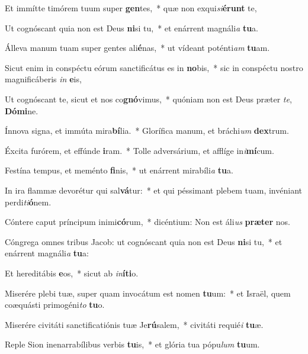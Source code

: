 \item Et immítte timórem tuum super \textbf{gen}tes,~* quæ non exqui\textit{si}\textbf{é}\textbf{runt} te,
\item Ut cognóscant quia non est Deus \textbf{ni}si tu,~* et enárrent magnáli\textit{a} \textbf{tu}a.
\item Álleva manum tuam super gentes ali\textbf{é}nas,~* ut vídeant poténti\textit{am} \textbf{tu}am.
\item Sicut enim in conspéctu eórum sanctificátus es in \textbf{no}bis,~* sic in conspéctu nostro magnificáberis \textit{in} \textbf{e}is,
\item Ut cognóscant te, sicut et nos co\textbf{gnó}vimus,~* quóniam non est Deus præter \textit{te}, \textbf{Dó}\textbf{mi}ne.
\item Ínnova signa, et immúta mira\textbf{bí}lia.~* Glorífica manum, et bráchi\textit{um} \textbf{dex}trum.
\item Éxcita furórem, et effúnde \textbf{i}ram.~* Tolle adversárium, et afflíge in\textit{i}\textbf{mí}cum.
\item Festína tempus, et meménto \textbf{fi}nis,~* ut enárrent mirabíli\textit{a} \textbf{tu}a.
\item In ira flammæ devorétur qui sal\textbf{vá}tur:~* et qui péssimant plebem tuam, invéniant perdi\textit{ti}\textbf{ó}nem.
\item Cóntere caput príncipum inimi\textbf{có}rum,~* dicéntium: Non est áli\textit{us} \textbf{præ}\textbf{ter} nos.
\item Cóngrega omnes tribus Jacob: ut cognóscant quia non est Deus \textbf{ni}si tu,~* et enárrent magnáli\textit{a} \textbf{tu}a:
\item Et hereditábis \textbf{e}os,~* sicut ab \textit{in}\textbf{í}\textbf{ti}o.
\item Miserére plebi tuæ, super quam invocátum est nomen \textbf{tu}um:~* et Israël, quem coæquásti primogéni\textit{to} \textbf{tu}o.
\item Miserére civitáti sanctificatiónis tuæ Je\textbf{rú}salem,~* civitáti requié\textit{i} \textbf{tu}æ.
\item Reple Sion inenarrabílibus verbis \textbf{tu}is,~* et glória tua pópu\textit{lum} \textbf{tu}um.

